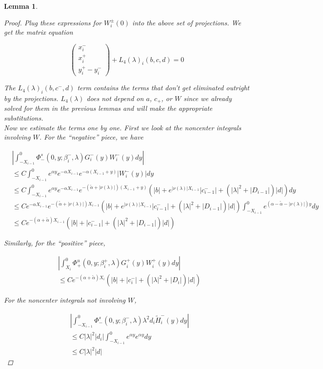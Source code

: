 \documentclass[12pt]{article}
\newtheorem{lemma}{Lemma}
\begin{document}
\begin{lemma}
\begin{proof}
Plug these expressions for $W_i^\pm(0)$ into the above set of projections. We get the matrix equation

\[
\begin{pmatrix}x_i^- \\ x_i^+ \\ 
y_i^+ - y_i^- \end{pmatrix} + L_4(\lambda)_i(b, c, d) = 0
\]

The $L_4(\lambda)_i(b, c^-, d)$ term contains the terms that don't get eliminated outright by the projections. $L_4(\lambda)$ does not depend on $a$, $c_+$, or $W$ since we already solved for them in the previous lemmas and will make the appropriate substitutions.\\

Now we estimate the terms one by one. First we look at the noncenter integrals involving $W$. For the ``negative'' piece, we have

\begin{align*}
&\left| \int_{-X_{i-1}}^0 \Phi^s_-(0, y; \beta_i^-, \lambda) G_i^-(y)W_i^-(y) dy \right| \\
&\leq C \int_{-X_{i-1}}^0 e^{\alpha y} e^{-\alpha X_{i-1}} e^{-\alpha(X_{i-1} + y)} |W_i^-(y)| dy \\
&\leq C \int_{-X_{i-1}}^0 e^{\alpha y} e^{-\alpha X_{i-1}} e^{-(\tilde{\alpha} + |\nu(\lambda)|)(X_{i-1} + y)} ( |b| + e^{|\nu(\lambda)|X_{i-1}}|c_{i-1}^-| + (|\lambda|^2 + |D_{i-1}|)|d| ) dy \\
&\leq C e^{-\alpha X_{i-1} } e^{-(\tilde{\alpha} + |\nu(\lambda)|) X_{i-1}}( |b| + e^{|\nu(\lambda)|X_{i-1}}|c_{i-1}^-| + (|\lambda|^2 + |D_{i-1}|)|d| ) \int_{-X_{i-1}}^0 e^{(\alpha - \tilde{\alpha} - |\nu(\lambda)|)y} dy \\
&\leq C e^{-(\alpha + \tilde{\alpha}) X_{i-1}}( |b| + |c_{i-1}^-| + (|\lambda|^2 + |D_{i-1}|)|d| )
\end{align*}

Similarly, for the ``positive'' piece,

\begin{align*}
&\left| \int_{X_i}^0 \Phi^u_+(0, y; \beta_i^+, \lambda) G_i^+(y)W_i^+(y) dy \right| \\
&\leq C e^{-(\alpha + \tilde{\alpha}) X_i}( |b| + |c_i^-| + (|\lambda|^2 + |D_i|)|d| )
\end{align*}

For the noncenter integrals not involving $W$,

\begin{align*}
&\left| \int_{-X_{i-1}}^0
\Phi^s_-(0, y; \beta_i^-, \lambda) \lambda^2 d_i \tilde{H}_i^-(y) dy \right| \\
&\leq C |\lambda|^2 |d_i| \int_{-X_{i-1}}^0 e^{\alpha y} e^{\alpha y} dy \\
&\leq C |\lambda|^2 |d| 
\end{align*}


\end{proof}
\end{lemma}
\end{document}
